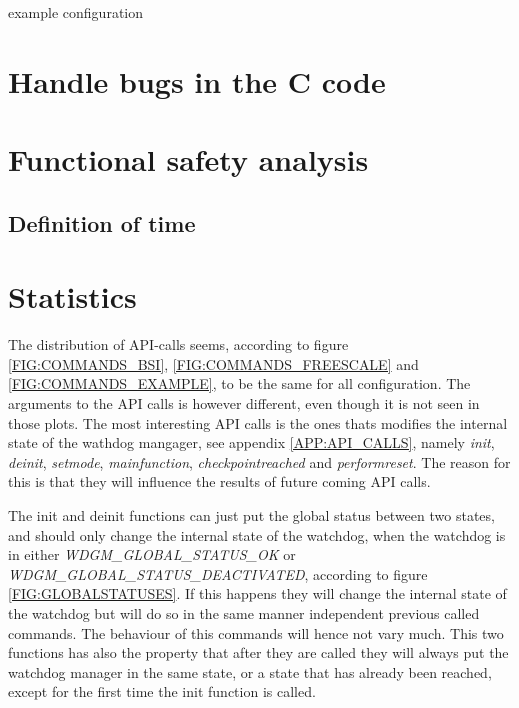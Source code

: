 \begin{table}[!h]
  \caption{example configuration}
  \label{TABLE:STATUSES_EXAMPLE}
  
\end{table}

\section{Handle bugs in the C code}
\label{sec:handlebugs}

\section{Functional safety analysis}
\subsection{Definition of time}
\label{SEC:FUNCTIONAL_SAFETY_TIME}

\section{Statistics}
The distribution of API-calls seems, according to figure
\ref{FIG:COMMANDS_BSI}, \ref{FIG:COMMANDS_FREESCALE} and
\ref{FIG:COMMANDS_EXAMPLE}, to be the same for all configuration. The arguments
to the API calls is however different, even though it is not seen in those plots.
The most interesting API calls is the ones thats modifies the internal state of
the wathdog mangager, see appendix \ref{APP:API_CALLS}, namely \emph{init},
\emph{deinit}, \emph{setmode}, \emph{mainfunction},
\emph{checkpointreached} and \emph{performreset}. The reason for this is that
they will influence the results of future coming API calls.

The init and deinit functions can just put the global
status between two states, and should only change the internal state of the
watchdog, when the watchdog is in either \emph{WDGM\_GLOBAL\_STATUS\_OK}
or \emph{WDGM\_GLOBAL\_STATUS\_DEACTIVATED}, according to
figure \ref{FIG:GLOBALSTATUSES}. If this happens they will change the internal
state of the watchdog but will do so in the same manner independent previous
called commands. The behaviour of this commands will hence not vary much.
This two functions has also the property that after they are called they will
always put the watchdog manager in the same state, or a state that has already
been reached, except for the first time the init function is called.

